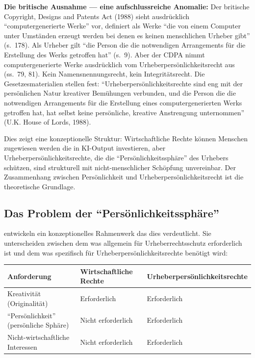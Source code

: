 \documentclass[acmlarge, noacm]{acmart}
\begin{document}
\textbf{Die britische Ausnahme --- eine aufschlussreiche Anomalie:} Der britische Copyright, Designs and Patents Act (1988) sieht ausdrücklich ``computergenerierte Werke'' vor, definiert als Werke ``die von einem Computer unter Umständen erzeugt werden bei denen es keinen menschlichen Urheber gibt'' (s.~178). Als Urheber gilt ``die Person die die notwendigen Arrangements für die Erstellung des Werks getroffen hat'' (s.~9). Aber der CDPA nimmt computergenerierte Werke ausdrücklich vom Urheberpersönlichkeitsrecht aus (ss.~79, 81). Kein Namensnennungsrecht, kein Integritätsrecht. Die Gesetzesmaterialien stellen fest: ``Urheberpersönlichkeitsrechte sind eng mit der persönlichen Natur kreativer Bemühungen verbunden, und die Person die die notwendigen Arrangements für die Erstellung eines computergenerierten Werks getroffen hat, hat selbst keine persönliche, kreative Anstrengung unternommen'' (U.K. House of Lords, 1988).

Dies zeigt eine konzeptionelle Struktur: Wirtschaftliche Rechte können Menschen zugewiesen werden die in KI-Output investieren, aber Urheberpersönlichkeitsrechte, die die ``Persönlichkeitssphäre'' des Urhebers schützen, sind strukturell mit nicht-menschlicher Schöpfung unvereinbar. Der Zusammenhang zwischen Persönlichkeit und Urheberpersönlichkeitsrecht ist die theoretische Grundlage.

\subsection{Das Problem der ``Persönlichkeitssphäre''}

\citet{miernicki2021} entwickeln ein konzeptionelles Rahmenwerk das dies verdeutlicht. Sie unterscheiden zwischen dem was allgemein für Urheberrechtsschutz erforderlich ist und dem was spezifisch für Urheberpersönlichkeitsrechte benötigt wird:

\begin{center}
\begin{tabular}{@{}lll@{}}
\toprule
Anforderung & Wirtschaftliche Rechte & Urheberpersönlichkeitsrechte \\
\midrule
Kreativität (Originalität) & Erforderlich & Erforderlich \\
``Persönlichkeit'' (persönliche Sphäre) & Nicht erforderlich & Erforderlich \\
Nicht-wirtschaftliche Interessen & Nicht erforderlich & Erforderlich \\
\bottomrule
\end{tabular}
\end{center}
\end{document}
